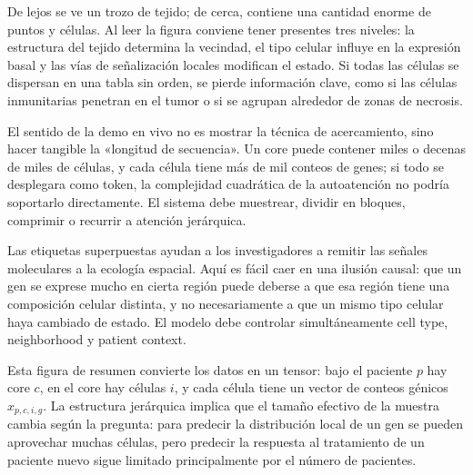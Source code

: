 De lejos se ve un trozo de tejido; de cerca, contiene una cantidad enorme de puntos y células. Al leer la figura conviene tener presentes tres niveles: la estructura del tejido determina la vecindad, el tipo celular influye en la expresión basal y las vías de señalización locales modifican el estado. Si todas las células se dispersan en una tabla sin orden, se pierde información clave, como si las células inmunitarias penetran en el tumor o si se agrupan alrededor de zonas de necrosis.


El sentido de la demo en vivo no es mostrar la técnica de acercamiento, sino hacer tangible la «longitud de secuencia». Un core puede contener miles o decenas de miles de células, y cada célula tiene más de mil conteos de genes; si todo se desplegara como token, la complejidad cuadrática de la autoatención no podría soportarlo directamente. El sistema debe muestrear, dividir en bloques, comprimir o recurrir a atención jerárquica.


Las etiquetas superpuestas ayudan a los investigadores a remitir las señales moleculares a la ecología espacial. Aquí es fácil caer en una ilusión causal: que un gen se exprese mucho en cierta región puede deberse a que esa región tiene una composición celular distinta, y no necesariamente a que un mismo tipo celular haya cambiado de estado. El modelo debe controlar simultáneamente cell type, neighborhood y patient context.


Esta figura de resumen convierte los datos en un tensor: bajo el paciente $p$ hay core $c$, en el core hay células $i$, y cada célula tiene un vector de conteos génicos $x_{p,c,i,g}$. La estructura jerárquica implica que el tamaño efectivo de la muestra cambia según la pregunta: para predecir la distribución local de un gen se pueden aprovechar muchas células, pero predecir la respuesta al tratamiento de un paciente nuevo sigue limitado principalmente por el número de pacientes.

